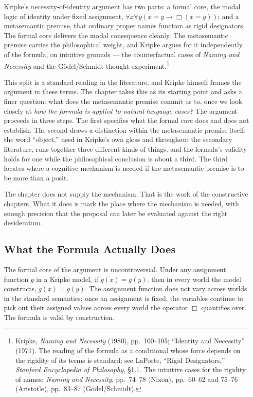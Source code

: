 \documentclass[12pt,a4paper]{article}
\begin{document}
Kripke's necessity-of-identity argument has two parts: a formal core, the modal logic of identity under fixed assignment, \(\forall x \forall y (x = y \to \Box(x = y))\); and a metasemantic premise, that ordinary proper names function as rigid designators. The formal core delivers the modal consequence cleanly. The metasemantic premise carries the philosophical weight, and Kripke argues for it independently of the formula, on intuitive grounds --- the counterfactual cases of \emph{Naming and Necessity} and the Gödel/Schmidt thought experiment.\footnote{Kripke, \emph{Naming and Necessity} (1980), pp.~100--105; ``Identity and Necessity'' (1971). The reading of the formula as a conditional whose force depends on the rigidity of its terms is standard; see LaPorte, ``Rigid Designators,'' \emph{Stanford Encyclopedia of Philosophy}, §1.1. The intuitive cases for the rigidity of names: \emph{Naming and Necessity}, pp.~74--78 (Nixon), pp.~60--62 and 75--76 (Aristotle), pp.~83--87 (Gödel/Schmidt).}

This split is a standard reading in the literature, and Kripke himself frames the argument in these terms. The chapter takes this as its starting point and asks a finer question: what does the metasemantic premise commit us to, once we look closely at \emph{how the formula is applied to natural-language cases?} The argument proceeds in three steps. The first specifies what the formal core does and does not establish. The second draws a distinction within the metasemantic premise itself: the word ``object,'' used in Kripke's own gloss and throughout the secondary literature, runs together three different kinds of things, and the formula's validity holds for one while the philosophical conclusion is about a third. The third locates where a cognitive mechanism is needed if the metasemantic premise is to be more than a posit.

The chapter does not supply the mechanism. That is the work of the constructive chapters. What it does is mark the place where the mechanism is needed, with enough precision that the proposal can later be evaluated against the right desideratum.

\subsection{What the Formula Actually Does}\label{what-the-formula-actually-does}

The formal core of the argument is uncontroversial. Under any assignment function \(g\) in a Kripke model, if \(g(x) = g(y)\), then in every world the model constructs, \(g(x) = g(y)\). The assignment function does not vary across worlds in the standard semantics; once an assignment is fixed, the variables continue to pick out their assigned values across every world the operator \(\Box\) quantifies over. The formula is valid by construction.
\end{document}
